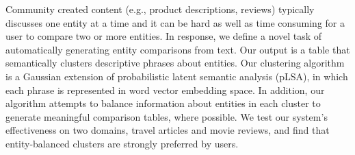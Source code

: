Community created content (e.g., product descriptions, reviews) typically discusses one entity at a time and it can be hard as well as time consuming for a user to compare two or more entities. In response, we define a novel task of automatically generating entity  comparisons from text. Our output is a table that semantically clusters descriptive phrases about entities. Our clustering algorithm is a Gaussian extension of probabilistic latent semantic analysis (pLSA), in which each phrase is represented in word vector embedding space. In addition, our algorithm attempts to balance information about entities in each cluster to generate meaningful comparison tables, where possible. We test our system's effectiveness on two domains, travel articles and movie reviews, and find that entity-balanced clusters are strongly preferred by users.
